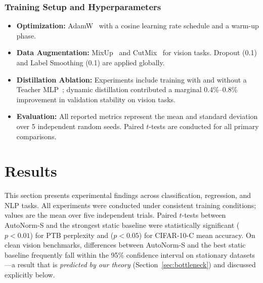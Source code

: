 \documentclass[conference]{IEEEtran}
\begin{document}
\subsubsection{Training Setup and Hyperparameters}
\begin{itemize}
    \item \textbf{Optimization:} AdamW~\cite{loshchilov2019adamw} with a
      cosine learning rate schedule and a warm-up phase.
    \item \textbf{Data Augmentation:} MixUp~\cite{zhang2017mixup} and
      CutMix~\cite{yun2019cutmix} for vision tasks. Dropout (0.1) and
      Label Smoothing (0.1) are applied globally.
    \item \textbf{Distillation Ablation:} Experiments include training
      with and without a Teacher MLP~\cite{hinton2015distilling};
      dynamic distillation contributed a marginal 0.4\%--0.8\%
      improvement in validation stability on vision tasks.
    \item \textbf{Evaluation:} All reported metrics represent the mean
      and standard deviation over 5 independent random seeds. Paired
      $t$-tests are conducted for all primary comparisons.
      
\end{itemize}
\empty
\section{Results}
\label{sec:results}

This section presents experimental findings across classification,
regression, and NLP tasks. All experiments were conducted under
consistent training conditions; values are the mean over five
independent trials. Paired $t$-tests between AutoNorm-S and the
strongest static baseline were statistically significant ($p < 0.01$)
for PTB perplexity and ($p < 0.05$) for CIFAR-10-C mean accuracy. On
clean vision benchmarks, differences between AutoNorm-S and the best
static baseline frequently fall within the 95\% confidence interval on
stationary datasets---a result that is \textit{predicted by our
theory} (Section~\ref{sec:bottleneck}) and discussed explicitly below.
\end{document}
